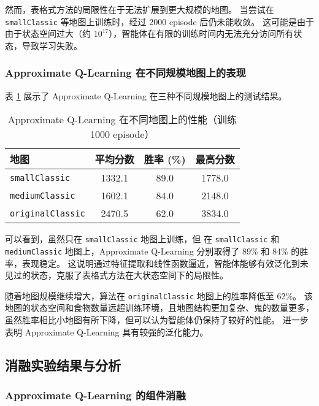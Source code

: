 然而，表格式方法的局限性在于无法扩展到更大规模的地图。
当尝试在 \texttt{smallClassic} 等地图上训练时，经过 2000 episode 后仍未能收敛。
这可能是由于由于状态空间过大（约 $10^{17}$），智能体在有限的训练时间内无法充分访问所有状态，导致学习失败。

\subsubsection{Approximate Q-Learning 在不同规模地图上的表现}

表 \ref{tab:approx_q_performance} 展示了 Approximate Q-Learning 在三种不同规模地图上的测试结果。

\begin{table}[h]
    \renewcommand{\arraystretch}{1.5}
    \setlength{\tabcolsep}{10pt}
    \centering
    \caption{Approximate Q-Learning 在不同地图上的性能（训练 1000 episode）}
    \small
    \begin{tabular}{lccc}
        \toprule
        \textbf{地图} & \textbf{平均分数} & \textbf{胜率 (\%)} & \textbf{最高分数} \\
        \midrule
        \texttt{smallClassic} & 1332.1 & 89.0 & 1778.0 \\
        \texttt{mediumClassic} & 1602.1 & 84.0 & 2148.0 \\
        \texttt{originalClassic} & 2470.5 & 62.0 & 3834.0 \\
        \bottomrule
    \end{tabular}
    \label{tab:approx_q_performance}
\end{table}

可以看到，虽然只在 \texttt{smallClassic} 地图上训练，但
在 \texttt{smallClassic} 和 \texttt{mediumClassic} 地图上，Approximate Q-Learning 分别取得了 89\% 和 84\% 的胜率，表现稳定。
这说明通过特征提取和线性函数逼近，智能体能够有效泛化到未见过的状态，克服了表格式方法在大状态空间下的局限性。

随着地图规模继续增大，算法在 \texttt{originalClassic} 地图上的胜率降低至 62\%。
该地图的状态空间和食物数量远超训练环境，且地图结构更加复杂、鬼的数量更多，
虽然胜率相比小地图有所下降，但可以认为智能体仍保持了较好的性能。
进一步表明 Approximate Q-Learning 具有较强的泛化能力。


\subsection{消融实验结果与分析}

\subsubsection{Approximate Q-Learning 的组件消融}

